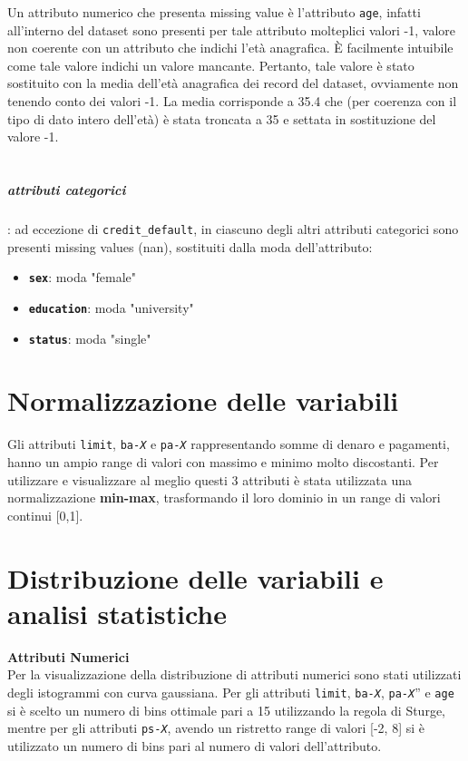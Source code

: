 Un attributo numerico che presenta missing value \`e l'attributo \texttt{age}, infatti all'interno del dataset sono presenti per tale attributo molteplici valori -1, valore non coerente con un attributo che indichi l'et\`a anagrafica. \`E facilmente intuibile come tale valore indichi un valore mancante. Pertanto, tale valore \`e stato sostituito con la media dell'et\`a anagrafica dei record del dataset, ovviamente non tenendo conto dei valori -1. La media corrisponde a 35.4 che (per coerenza con il tipo di dato intero dell'et\`a) \`e stata troncata a 35 e settata in sostituzione del valore -1.\\\\
\subparagraph{attributi categorici}: ad eccezione di \texttt{credit\_default}, in ciascuno degli altri attributi categorici sono presenti missing values (nan), sostituiti dalla moda dell'attributo:
\begin{itemize}
\item \textbf{\texttt{sex}}: moda "female"
\item \textbf{\texttt{education}}: moda "university"
\item \textbf{\texttt{status}}: moda "single"
\end{itemize}

\section{Normalizzazione delle variabili}
Gli attributi \texttt{limit}, \texttt{ba-\textit{X}} e \texttt{pa-\textit{X}} rappresentando somme di denaro e pagamenti, hanno un ampio range di valori con massimo e minimo molto discostanti. Per utilizzare e visualizzare al meglio questi 3 attributi \`e stata utilizzata una normalizzazione \textbf{min-max}, trasformando il loro dominio in un range di valori continui [0,1].

\section{Distribuzione delle variabili e analisi statistiche}
\textbf{Attributi Numerici}\\
Per la visualizzazione della distribuzione di attributi numerici sono stati utilizzati degli istogrammi con curva gaussiana. Per gli attributi \texttt{limit},  \texttt{ba-\textit{X}}, \texttt{pa-\textit{X}}” e \texttt{age} si \`e scelto un numero di bins ottimale pari a 15 utilizzando la regola di Sturge, mentre per gli attributi  \texttt{ps-\textit{X}}, avendo un ristretto range di valori [-2, 8] si \`e utilizzato un numero di bins pari al numero di valori dell'attributo.

